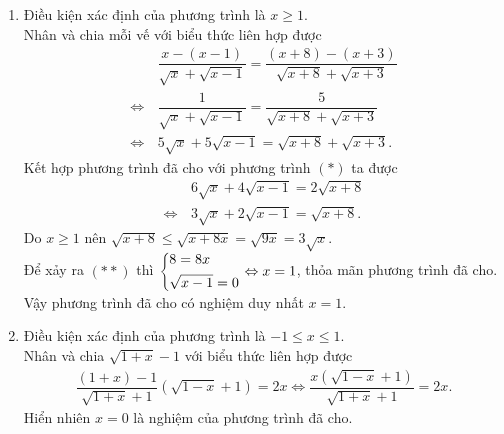 \begin{bt}
{\begin{enumerate}
			Nhân và chia biểu thức trong dấu ngoặc với biểu thức liên hợp ta được
			\begin{eqnarray*}
				&& \dfrac{\left(x+2\right)-4}{\sqrt{x+2}+2}+\dfrac{1-\left(3-x\right)}{1+\sqrt{3-x}}=\left(x-2\right)\left(x-4\right)\\
				&\Leftrightarrow & \left(x-2\right)\left(\dfrac{1}{2+\sqrt{x+2}}+\dfrac{1}{1+\sqrt{3-x}}+4-x\right)=0.
			\end{eqnarray*}
			Do $-2\le x\le 3$ nên $4-x>0$, do đó biểu thức trong dấu ngoặc thứ hai dương.\\
			Vậy $x-2=0$ hay $x=2$, thỏa điều kiện xác định.\\
			Vậy phương trình đã cho có nghiệm duy nhất $x=2$.
			\item Điều kiện xác định của phương trình là $x\ge 1$.\\
			Nhân và chia mỗi vế với biểu thức liên hợp được
			\begin{align}
			& \dfrac{x-(x-1)}{\sqrt{x}+\sqrt{x-1}}=\dfrac{(x+8)-(x+3)}{\sqrt{x+8}+\sqrt{x+3}} \nonumber\\
			\Leftrightarrow\, & \dfrac{1}{\sqrt{x}+\sqrt{x-1}}=\dfrac{5}{\sqrt{x+8}+\sqrt{x+3}} \nonumber\\
			\Leftrightarrow\, & 5\sqrt{x}+5\sqrt{x-1}=\sqrt{x+8}+\sqrt{x+3}. \tag{$*$}
			\end{align}
			Kết hợp phương trình đã cho với phương trình $(*)$ ta được
			\begin{align*}
			& 6\sqrt{x}+4\sqrt{x-1}=2\sqrt{x+8}\\
			\Leftrightarrow\, & 3\sqrt{x}+2\sqrt{x-1}=\sqrt{x+8}. \tag{$**$}
			\end{align*}
			Do $x\ge 1$ nên $\sqrt{x+8}\le\sqrt{x+8x}=\sqrt{9x}=3\sqrt{x}$.\\
			Để xảy ra $(**)$ thì $\left\{\begin{aligned}&8=8x\\&\sqrt{x-1}=0\end{aligned}\right.\Leftrightarrow x=1$, thỏa mãn phương trình đã cho.\\
			Vậy phương trình đã cho có nghiệm duy nhất $x=1$.
			\item Điều kiện xác định của phương trình là $-1\le x\le 1$.\\
			Nhân và chia $\sqrt{1+x}-1$ với biểu thức liên hợp được
			\begin{eqnarray*}
				\dfrac{(1+x)-1}{\sqrt{1+x}+1}\left(\sqrt{1-x}+1\right)=2x\Leftrightarrow \dfrac{x\left(\sqrt{1-x}+1\right)}{\sqrt{1+x}+1}=2x.
			\end{eqnarray*}
			Hiển nhiên $x=0$ là nghiệm của phương trình đã cho.\\

\end{enumerate}}
\end{bt}

